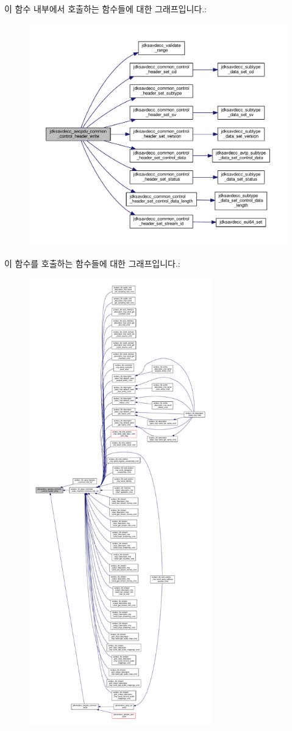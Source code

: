 이 함수 내부에서 호출하는 함수들에 대한 그래프입니다.\+:
\nopagebreak
\begin{figure}[H]
\begin{center}
\leavevmode
\includegraphics[width=350pt]{group__aecpdu_ga828eb506e6ecb72b56d72cd4e4fd433a_cgraph}
\end{center}
\end{figure}




이 함수를 호출하는 함수들에 대한 그래프입니다.\+:
\nopagebreak
\begin{figure}[H]
\begin{center}
\leavevmode
\includegraphics[height=550pt]{group__aecpdu_ga828eb506e6ecb72b56d72cd4e4fd433a_icgraph}
\end{center}
\end{figure}


